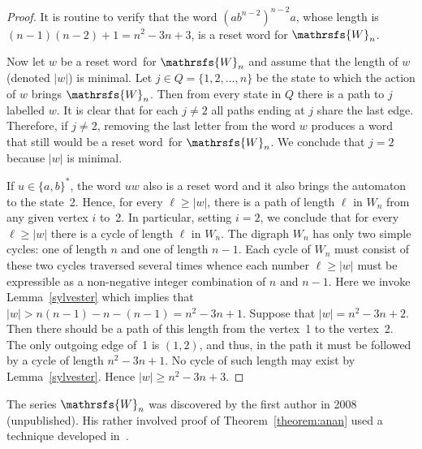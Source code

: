 \documentclass[11pt]{llncs}
\newcommand{\sw}{reset word}
\begin{document}
\begin{proof}
It is routine to verify that the word $(ab^{n-2})^{n-2}a$, whose length
is $(n-1)(n-2)+1=n^2-3n+3$, is a reset word for $\mathrsfs{W}_n$.

Now let $w$ be a \sw\ for $\mathrsfs{W}_n$ and assume that the length
of $w$ (denoted $|w|$) is minimal. Let $j\in Q=\{1,2,\dots,n\}$ be the
state to which the action of $w$ brings $\mathrsfs{W}_n$. Then from
every state in $Q$ there is a path to $j$ labelled $w$. It is clear
that for each $j\ne 2$ all paths ending at $j$ share the last edge.
Therefore, if $j\ne 2$, removing the last letter from the word $w$
produces a word that still would be a \sw\ for $\mathrsfs{W}_n$.
We conclude that $j=2$ because $|w|$ is minimal.

If $u\in\{a,b\}^*$, the word $uw$ also is a reset word and it also
brings the automaton to the state~2. Hence, for every $\ell\ge|w|$,
there is a path of length $\ell$ in $W_n$ from any given vertex $i$
to~2. In particular, setting $i=2$, we conclude that for every
$\ell\ge|w|$ there is a cycle of length $\ell$ in $W_n$. The digraph
$W_n$ has only two simple cycles: one of length $n$ and one of length $n-1$.
Each cycle of $W_n$ must consist of these two cycles traversed several times
whence each number $\ell\ge|w|$ must be expressible as a non-negative integer
combination of $n$ and $n-1$. Here we invoke Lemma~\ref{sylvester} which
implies that $|w|>n(n-1)-n-(n-1)=n^2-3n+1$. Suppose that $|w|=n^2-3n+2$.
Then there should be a path of this length from the vertex~1 to the vertex~2.
The only outgoing edge of~1 is $(1,2)$, and thus, in the path it must be
followed by a cycle of length $n^2-3n+1$. No cycle of such length may
exist by  Lemma~\ref{sylvester}. Hence $|w|\ge n^2-3n+3$.
\end{proof}

The series $\mathrsfs{W}_n$ was discovered by the first author in 2008
(unpublished). His rather involved proof of Theorem~\ref{theorem:anan}
used a technique developed in~\cite{AVZ}.
\end{document}
